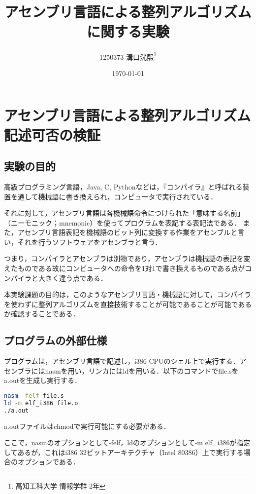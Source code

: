 \documentclass[paper=a4,11pt]{jlreq}
\title{\vspace{-2cm}{\normalsize 情報学群実験第2 レポート}\\\vspace{0.5em}アセンブリ言語による整列アルゴリズムに関する実験}
\author{1250373 溝口洸熙\thanks{高知工科大学 情報学群 2年}}
\date{\today}
\begin{document}
\maketitle
{}\pagestyle{plain}
\setcounter{tocdepth}{3}
\tableofcontents

\newpage
\newcommand{\testsort}{{\ttfamily test\_sort.s}}
\newcommand{\sort}{{\ttfamily sort}}
\newcommand{\print}{{\ttfamily print\_eax}}
\setcounter{page}{0}
\section{アセンブリ言語による整列アルゴリズム記述可否の検証}
\subsection{実験の目的}
高級プログラミング言語，{\ttfamily Java, C, Python}などは，『コンパイラ』と呼ばれる装置を通して機械語に書き換えられ，コンピュータで実行されている．\par
それに対して，アセンブリ言語は各機械語命令につけられた「意味する名前」（ニーモニック；mnemonic）を使ってプログラムを表記する表記法である．
また，アセンブリ言語表記を機械語のビット列に変換する作業をアセンブルと言い，それを行うソフトウェアをアセンブラと言う．\cite{assembly}\par
つまり，コンパイラとアセンブラは別物であり，アセンブラは機械語の表記を変えたものである故にコンピュータへの命令を1対1で書き換えるものである点がコンパイラと大きく違う点である．\par
本実験課題の目的は，このようなアセンブリ言語・機械語に対して，コンパイラを使わずに整列アルゴリズムを直接技術することが可能であることが可能であるか確認することである．
\subsection{プログラムの外部仕様}
プログラムは，アセンブリ言語で記述し，i386 CPUのシェル上で実行する．アセンブラには{\ttfamily nasm}を用い，リンカには{\ttfamily ld}を用いる．以下のコマンドで{\ttfamily file.s}を{\ttfamily a.out}を生成し実行する．
\begin{lstlisting}[language={Bash},numbers = {none},frame = {single}]
nasm -felf file.s
ld -m elf_i386 file.o
./a.out
    \end{lstlisting}
{\ttfamily a.out}ファイルは{\ttfamily chmod}で実行可能にする必要がある．\par
ここで，{\ttfamily nasm}のオプションとして{\ttfamily -felf}，{\ttfamily ld}のオプションとして{\ttfamily -m elf\_i386}が指定してあるが，これはi386 32ビットアーキテクチャ（Intel 80386）上で実行する場合のオプションである．
\end{document}
